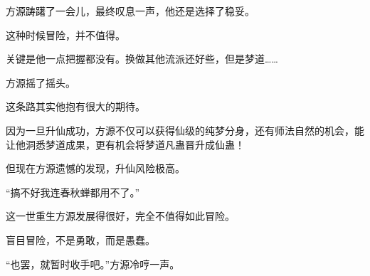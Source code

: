 \begin{this_body}
方源踌躇了一会儿，最终叹息一声，他还是选择了稳妥。

这种时候冒险，并不值得。

关键是他一点把握都没有。换做其他流派还好些，但是梦道……

方源摇了摇头。

这条路其实他抱有很大的期待。

因为一旦升仙成功，方源不仅可以获得仙级的纯梦分身，还有师法自然的机会，能让他洞悉梦道成果，更有机会将梦道凡蛊晋升成仙蛊！

但现在方源遗憾的发现，升仙风险极高。

“搞不好我连春秋蝉都用不了。”

这一世重生方源发展得很好，完全不值得如此冒险。

盲目冒险，不是勇敢，而是愚蠢。

“也罢，就暂时收手吧。”方源冷哼一声。

\end{this_body}


